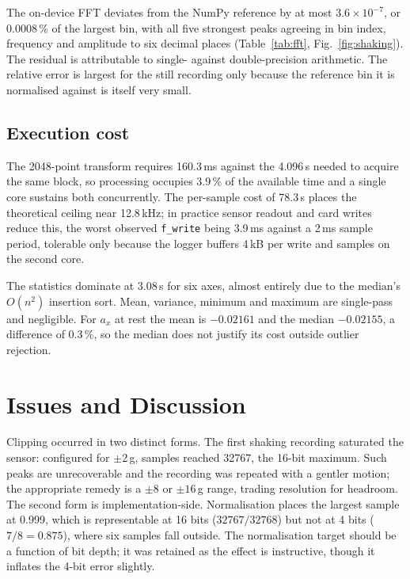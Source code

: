 \documentclass[conference]{IEEEtran}
\begin{document}
The on-device FFT deviates from the NumPy reference by at most
$3.6\times10^{-7}$, or 0.0008\,\% of the largest bin, with all five strongest
peaks agreeing in bin index, frequency and amplitude to six decimal places
(Table~\ref{tab:fft}, Fig.~\ref{fig:shaking}). The residual is attributable to
single- against double-precision arithmetic. The relative error is largest for
the still recording only because the reference bin it is normalised against is
itself very small.

\subsection{Execution cost}

The 2048-point transform requires 160.3\,ms against the 4.096\,s needed to
acquire the same block, so processing occupies 3.9\,\% of the available time and
a single core sustains both concurrently. The per-sample cost of
78.3\,\textmu s places the theoretical ceiling near 12.8\,kHz; in practice
sensor readout and card writes reduce this, the worst observed
\texttt{f\_write} being 3.9\,ms against a 2\,ms sample period, tolerable only
because the logger buffers 4\,kB per write and samples on the second core.

The statistics dominate at 3.08\,s for six axes, almost entirely due to the
median's $O(n^2)$ insertion sort. Mean, variance, minimum and maximum are
single-pass and negligible. For $a_x$ at rest the mean is $-0.02161$ and the
median $-0.02155$, a difference of 0.3\,\%, so the median does not justify its
cost outside outlier rejection.

\section{Issues and Discussion}

Clipping occurred in two distinct forms. The first shaking recording saturated
the sensor: configured for $\pm2$\,g, samples reached 32767, the 16-bit maximum.
Such peaks are unrecoverable and the recording was repeated with a gentler
motion; the appropriate remedy is a $\pm8$ or $\pm16$\,g range, trading
resolution for headroom. The second form is implementation-side. Normalisation
places the largest sample at 0.999, which is representable at 16 bits
($32767/32768$) but not at 4 bits ($7/8 = 0.875$), where six samples fall
outside. The normalisation target should be a function of bit depth; it was
retained as the effect is instructive, though it inflates the 4-bit error
slightly.
\end{document}

